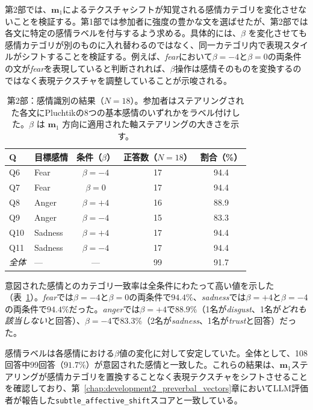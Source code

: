 第2部では、$\mathbf{m}_1$によるテクスチャシフトが知覚される感情カテゴリを変化させないことを検証する。第1部では参加者に強度の豊かな文を選ばせたが、第2部では各文に特定の感情ラベルを付与するよう求める。具体的には、$\beta$ を変化させても感情カテゴリが別のものに入れ替わるのではなく、同一カテゴリ内で表現スタイルがシフトすることを検証する。例えば、\textit{fear}において$\beta=-4$と$\beta=0$の両条件の文が\textit{fear}を表現していると判断されれば、$\beta$操作は感情そのものを変換するのではなく表現テクスチャを調整していることが示唆される。\par

\begin{table}[H]
\centering
\small
\begin{tabular}{llccc}
\toprule
\textbf{Q} & \textbf{目標感情} & \textbf{条件（$\beta$）} & \textbf{正答数（$N=18$）} & \textbf{割合（\%）} \\
\midrule
Q6  & Fear    & $\beta = -4$ & 17 & 94.4 \\
Q7  & Fear    & $\beta = 0$  & 17 & 94.4 \\
\midrule
Q8  & Anger   & $\beta = +4$ & 16 & 88.9 \\
Q9  & Anger   & $\beta = -4$ & 15 & 83.3 \\
\midrule
Q10 & Sadness & $\beta = +4$ & 17 & 94.4 \\
Q11 & Sadness & $\beta = -4$ & 17 & 94.4 \\
\midrule
\textit{全体} & --- & --- & 99 & 91.7 \\
\bottomrule
\end{tabular}
\caption{第2部：感情識別の結果（$N = 18$）。参加者はステアリングされた各文にPluchtikの8つの基本感情のいずれかをラベル付けした。$\beta$ は $\mathbf{m}_1$ 方向に適用された軸ステアリングの大きさを示す。}
\label{tab:human_eval_p2}
\end{table}

意図された感情とのカテゴリ一致率は全条件にわたって高い値を示した（表~\ref{tab:human_eval_p2}）。\textit{fear}では$\beta = -4$と$\beta = 0$の両条件で$94.4\%$、\textit{sadness}では$\beta = +4$と$\beta = -4$の両条件で$94.4\%$だった。\textit{anger}では$\beta = +4$で$88.9\%$（1名が\textit{disgust}、1名が\textit{どれも該当しない}と回答）、$\beta = -4$で$83.3\%$（2名が\textit{sadness}、1名が\textit{trust}と回答）だった。\par

感情ラベルは各感情における$\beta$値の変化に対して安定していた。全体として、108回答中99回答（$91.7\%$）が意図された感情と一致した。これらの結果は、$\mathbf{m}_1$ステアリングが感情カテゴリを置換することなく表現テクスチャをシフトさせることを確認しており、第~\ref{chap:development2_preverbal_vectors}章においてLLM評価者が報告した\texttt{subtle\_affective\_shift}スコアと一致している。\par

